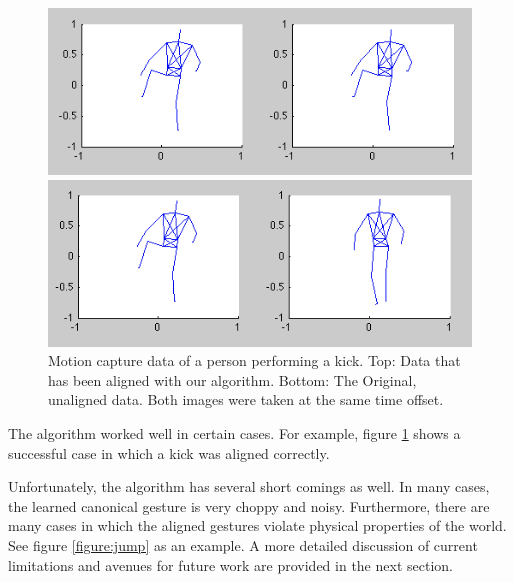 \documentclass{article}
\begin{document}
\begin{figure}
\begin{centering}

\begin{centering}
\includegraphics[width=\columnwidth]{figures/kick_aligned.png}	
\end{centering}
\begin{centering}
\includegraphics[width=\columnwidth]{figures/kick_unaligned.png}	
\end{centering}

\vspace{-0.2in}

\caption{Motion capture data of a person performing a kick. Top:
 Data that has
been aligned with our algorithm. Bottom: The Original, unaligned data. Both
images were taken at the same time offset. \label{figure:kick}}

\end{centering}
\end{figure}


The algorithm worked well in certain cases. For example, figure
\ref{figure:kick} shows a successful case in which a kick was aligned correctly.


Unfortunately, the algorithm has several short comings as well. In many cases,
the learned canonical gesture is very choppy and noisy. Furthermore, there are
many cases in which the aligned gestures violate physical properties of the
world. See figure \ref{figure:jump} as an example. A more detailed discussion of
current limitations and avenues for future work are provided in the next
section.
\end{document}
